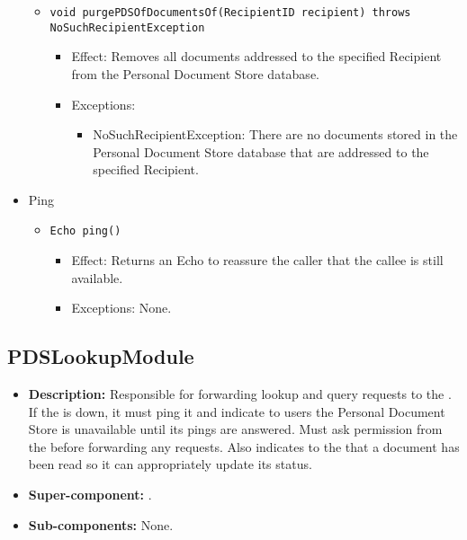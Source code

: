 \begin{itemize}
\begin{itemize}
		\item \texttt{void purgePDSOfDocumentsOf(RecipientID recipient) throws NoSuchRecipientException}
		\begin{itemize}
			\item Effect: Removes all documents addressed to the specified Recipient from the Personal Document Store database.
			\item Exceptions:
			\begin{itemize}
				\item NoSuchRecipientException: There are no documents stored in the Personal Document Store database that are addressed to the specified Recipient.
			\end{itemize}
		\end{itemize}
	\end{itemize}

	\item Ping
	\begin{itemize}
		\item \texttt{Echo ping()}
		\begin{itemize}
			\item Effect: Returns an Echo to reassure the caller that the callee is still available.
			\item Exceptions: None.
		\end{itemize}
	\end{itemize}
\end{itemize}

\subsection{PDSLookupModule}
\begin{itemize}
    \item \textbf{Description:} Responsible for forwarding lookup and query requests to the . If the  is down, it must ping it and indicate to users the Personal Document Store is unavailable until its pings are answered. Must ask permission from the  before forwarding any requests. Also indicates to the  that a document has been read so it can appropriately update its status.
    \item \textbf{Super-component:} .
    \item \textbf{Sub-components:} None.
\end{itemize}

